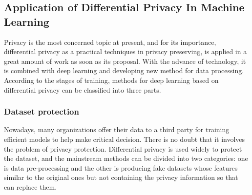 \documentclass[conference]{IEEEtran}
\begin{document}
\subsection{Application of Differential Privacy In Machine Learning}
Privacy is the most concerned topic at present, and for its importance, differential privacy as a practical techniques in privacy preserving, is applied in a great amount of work as soon as its proposal. With the advance of technology, it is combined with deep learning and developing new method for data processing. According to the stages of training, methods for deep learning based on differential privacy can be classified into three parts.

\subsubsection{Dataset protection}
Nowadays, many organizations offer their data to a third party for training efficient models to help make critical decision. There is no doubt that it involves the problem of privacy protection. Differential privacy is used widely to protect the dataset, and the mainstream methods can be divided into two categories: one is data pre-processing and the other is producing fake datasets whose features similar to the original ones but not containing the privacy information so that can replace them. 
\end{document}
